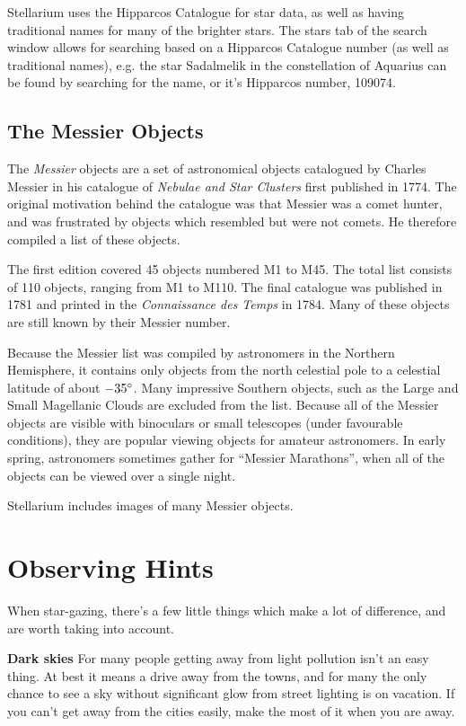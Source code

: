 Stellarium uses the Hipparcos Catalogue for star data, as well as having
traditional names for many of the brighter stars. The stars tab of the
search window allows for searching based on a Hipparcos Catalogue number
(as well as traditional names), e.g. the star Sadalmelik in the
constellation of Aquarius can be found by searching for the name, or
it's Hipparcos number, 109074.

\subsection{The Messier Objects}\label{the-messier-objects}

The \emph{Messier} objects are a set of astronomical objects catalogued
by Charles Messier in his catalogue of \emph{Nebulae and Star Clusters}
first published in 1774. The original motivation behind the catalogue
was that Messier was a comet hunter, and was frustrated by objects which
resembled but were not comets. He therefore compiled a list of these
objects.

The first edition covered 45 objects numbered M1 to M45. The total list
consists of 110 objects, ranging from M1 to M110. The final catalogue
was published in 1781 and printed in the \emph{Connaissance des Temps}
in 1784. Many of these objects are still known by their Messier number.

Because the Messier list was compiled by astronomers in the Northern
Hemisphere, it contains only objects from the north celestial pole to a
celestial latitude of about $-35\degree$. Many impressive Southern objects, such
as the Large and Small Magellanic Clouds are excluded from the list.
Because all of the Messier objects are visible with binoculars or small
telescopes (under favourable conditions), they are popular viewing
objects for amateur astronomers. In early spring, astronomers sometimes
gather for ``Messier Marathons'', when all of the objects can be viewed
over a single night.

Stellarium includes images of many Messier objects.

\section{Observing Hints}\label{observing-hints}

When star-gazing, there's a few little things which make a lot of
difference, and are worth taking into account.

\textbf{Dark skies} For many people getting away from light pollution
isn't an easy thing. At best it means a drive away from the towns, and
for many the only chance to see a sky without significant glow from
street lighting is on vacation. If you can't get away from the cities
easily, make the most of it when you are away.


